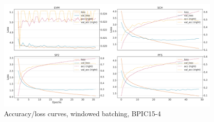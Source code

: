 \begin{figure}[!htb]
    \centering
    \includegraphics[width=\textwidth]{gfx/bpic2015_4/windowed_loss_acc_curve.pdf}
    \caption{Accuracy/loss curves, windowed batching, BPIC15-4}
\end{figure}
\FloatBarrier

